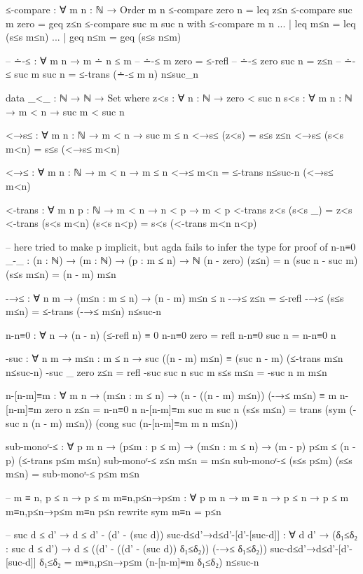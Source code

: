 \documentclass{article}
\begin{document}
\begin{prev}
\begin{code}
≤-compare : ∀ {m n : ℕ} → Order m n
≤-compare {zero} {n} = leq z≤n
≤-compare {suc m} {zero} = geq z≤n
≤-compare {suc m} {suc n} with ≤-compare {m} {n}
... | leq m≤n = leq (s≤s m≤n)
... | geq n≤m = geq (s≤s n≤m)

-- ∸-≤ : ∀ {m n} → m ∸ n ≤ m
-- ∸-≤ {m} {zero} = ≤-refl
-- ∸-≤ {zero} {suc n} = z≤n
-- ∸-≤ {suc m} {suc n} = ≤-trans (∸-≤ {m} {n}) n≤suc_n

data _<_ : ℕ → ℕ → Set where
    z<s : ∀ {n : ℕ} → zero < suc n
    s<s : ∀ {m n : ℕ} → m < n → suc m < suc n

<→s≤ : ∀ {m n : ℕ} → m < n → suc m ≤ n
<→s≤ (z<s) = s≤s z≤n
<→s≤ (s<s m<n) = s≤s (<→s≤ m<n)

<→≤ : ∀ {m n : ℕ} → m < n → m ≤ n
<→≤ m<n = ≤-trans n≤suc-n (<→s≤ m<n)

<-trans : ∀ {m n p : ℕ} → m < n → n < p → m < p
<-trans z<s (s<s _) = z<s
<-trans (s<s m<n) (s<s n<p) = s<s (<-trans m<n n<p)

-- here tried to make p implicit, but agda fails to infer the type for proof of n-n≡0
_-_ : (n : ℕ) → (m : ℕ) → (p : m ≤ n) → ℕ
(n - zero) (z≤n) = n
(suc n - suc m) (s≤s m≤n) = (n - m) m≤n

-→≤ : ∀ {n m} → (m≤n : m ≤ n) → (n - m) m≤n ≤ n
-→≤ z≤n = ≤-refl
-→≤ (s≤s m≤n) = ≤-trans (-→≤ m≤n) n≤suc-n

n-n≡0 : ∀ {n} → (n - n) (≤-refl {n}) ≡ 0
n-n≡0 {zero} = refl
n-n≡0 {suc n} = n-n≡0 {n}

-suc : ∀ {n m} → {m≤n : m ≤ n} → suc ((n - m) m≤n) ≡ (suc n - m) (≤-trans m≤n n≤suc-n)
-suc {_} {zero} {z≤n} = refl
-suc {suc n} {suc m} {s≤s m≤n} = -suc {n} {m} {m≤n}

n-[n-m]≡m : ∀ {m n} → (m≤n : m ≤ n) → (n - ((n - m) m≤n)) (-→≤ m≤n) ≡ m 
n-[n-m]≡m {zero} {n} z≤n = n-n≡0 {n}
n-[n-m]≡m {suc m} {suc n} (s≤s m≤n) = trans (sym (-suc {n} {(n - m) m≤n})) (cong suc (n-[n-m]≡m {m} {n} m≤n))

sub-monoʳ-≤ : ∀ {p m n} → (p≤m : p ≤ m) → (m≤n : m ≤ n) → (m - p) p≤m ≤ (n - p) (≤-trans p≤m m≤n)
sub-monoʳ-≤ z≤n m≤n = m≤n
sub-monoʳ-≤ (s≤s p≤m) (s≤s m≤n) = sub-monoʳ-≤ p≤m m≤n

-- m ≡ n, p ≤ n → p ≤ m
m≡n,p≤n→p≤m : ∀ {p m n} → m ≡ n → p ≤ n → p ≤ m
m≡n,p≤n→p≤m m≡n p≤n rewrite sym m≡n = p≤n

-- suc d ≤ d' → d ≤ d' - (d' - (suc d))
suc-d≤d'→d≤d'-[d'-[suc-d]] : ∀ {d d'} → (δ₁≤δ₂ : suc d ≤ d') → d ≤ ((d' - ((d' - (suc d)) δ₁≤δ₂)) (-→≤ δ₁≤δ₂))
suc-d≤d'→d≤d'-[d'-[suc-d]] δ₁≤δ₂ = m≡n,p≤n→p≤m (n-[n-m]≡m δ₁≤δ₂) n≤suc-n
\end{code}
\end{prev}
\end{document}
